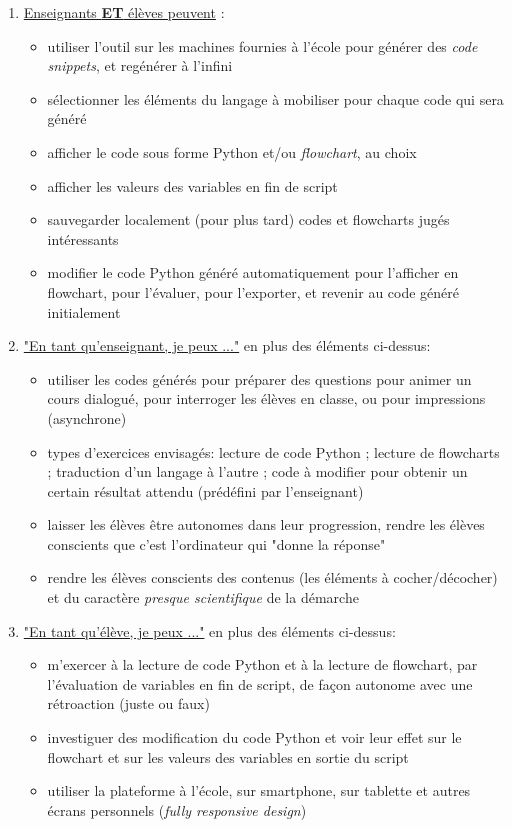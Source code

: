 \documentclass[11pt,a4paper]{article}
\begin{document}
\begin{enumerate}
    \item \underline{Enseignants \textbf{ET} élèves peuvent} :
    \begin{itemize}
        \item utiliser l'outil sur les machines fournies à l'école pour générer des \textit{code snippets}, et regénérer à l'infini
        \item sélectionner les éléments du langage à mobiliser pour chaque code qui sera généré
        \item afficher le code sous forme Python et/ou \textit{flowchart}, au choix
        \item afficher les valeurs des variables en fin de script
        \item sauvegarder localement (pour plus tard) codes et flowcharts jugés intéressants
        \item modifier le code Python généré automatiquement pour l'afficher en flowchart, pour l'évaluer, pour l'exporter, et revenir au code généré initialement
    \end{itemize}
    \item \underline{"En tant qu'enseignant, je peux ..."} en plus des éléments ci-dessus:
    \begin{itemize}
        \item utiliser les codes générés pour préparer des questions pour animer un cours dialogué, pour interroger les élèves en classe, ou pour impressions (asynchrone)
        \item types d'exercices envisagés: lecture de code Python ; lecture de flowcharts ; traduction d'un langage à l'autre ; code à modifier pour obtenir un certain résultat attendu (prédéfini par l'enseignant)
        \item laisser les élèves être autonomes dans leur progression, rendre les élèves conscients que c'est l'ordinateur qui "donne la réponse"
        \item rendre les élèves conscients des contenus (les éléments à cocher/décocher) et du caractère \textit{presque scientifique} de la démarche
    \end{itemize}
    \item \underline{"En tant qu'élève, je peux ..."} en plus des éléments ci-dessus:
    \begin{itemize}
        \item m'exercer à la lecture de code Python et à la lecture de flowchart, par l'évaluation de variables en fin de script, de façon autonome avec une rétroaction (juste ou faux)
        \item investiguer des modification du code Python et voir leur effet sur le flowchart et sur les valeurs des variables en sortie du script
        \item utiliser la plateforme à l'école, sur smartphone, sur tablette et autres écrans personnels (\textit{fully responsive design})
    \end{itemize}
\end{enumerate}
\end{document}
